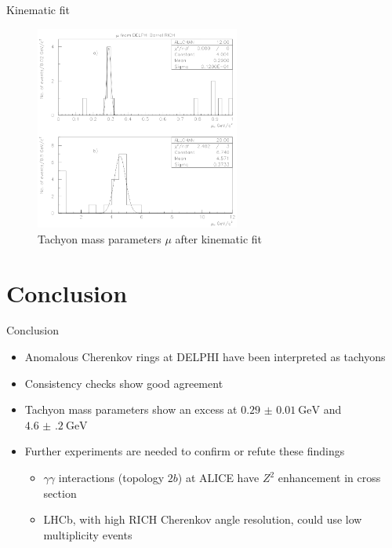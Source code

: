 \documentclass{beamer}
\begin{document}
\begin{frame}{Kinematic fit}
  \begin{figure}
    \centering
    \includegraphics[width = 0.6\textwidth]{ConstrainedMassParameters.png}
    \caption{Tachyon mass parameters $\mu$ after kinematic fit}
  \end{figure}
\end{frame}

\section{Conclusion}
\begin{frame}{Conclusion}
  \begin{itemize}
    \item{Anomalous Cherenkov rings at DELPHI have been interpreted as tachyons}
    \item{Consistency checks show good agreement}
    \item{Tachyon mass parameters show an excess at $\SI{0.29(1)}{\giga\eV}$ and $\SI{4.6(2)}{\giga\eV}$}
    \item{Further experiments are needed to confirm or refute these findings}
    \begin{itemize}
      \item{$\gamma\gamma$ interactions (topology $2b$) at ALICE have $Z^2$ enhancement in cross section}
      \item{LHCb, with high RICH Cherenkov angle resolution, could use low multiplicity events}
    \end{itemize}
  \end{itemize}
\end{frame}
\end{document}
